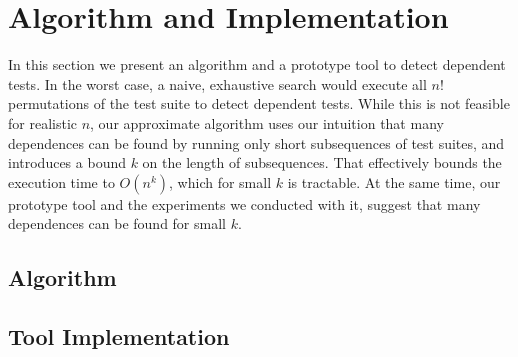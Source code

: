 

\section{Algorithm and Implementation}
\label{sec:algorithm-tool}

In this section we present an algorithm and a prototype tool to detect dependent
tests.
In the worst case, a naive, exhaustive search would execute all $n!$
permutations of the test suite to detect dependent tests. While this
is not feasible for realistic $n$, our approximate algorithm uses 
our intuition that many dependences can be found by running only short subsequences of
test suites, and introduces a bound $k$ on the length
of subsequences. That effectively bounds the execution time to
$O(n^k)$, which for small $k$ is tractable. At the same time, our
prototype tool and the experiments we conducted with it, suggest that
many dependences can be found for small $k$.

\subsection{Algorithm}
\label{sec:algorithm}


\subsection{Tool Implementation}
\label{sec:tool}

